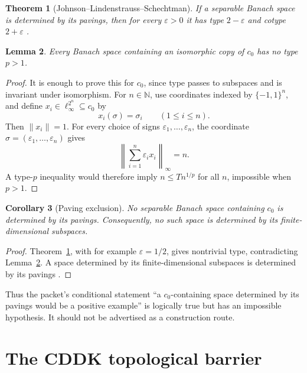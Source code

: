 \documentclass[11pt]{article}
\newtheorem{theorem}{Theorem}[section]
\newtheorem{corollary}[theorem]{Corollary}
\newtheorem{lemma}[theorem]{Lemma}
\theoremstyle{definition}
\newcommand{\czer}{c_0}
\begin{document}
\begin{theorem}[Johnson--Lindenstrauss--Schechtman]\label{thm:JLS}
If a separable Banach space is determined by its pavings, then for every
\(\varepsilon>0\) it has type \(2-\varepsilon\) and cotype
\(2+\varepsilon\) \cite[Proposition 7.4]{JLS}.
\end{theorem}

\begin{lemma}\label{lem:c0type}
Every Banach space containing an isomorphic copy of \(\czer\) has no type
\(p>1\).
\end{lemma}

\begin{proof}
It is enough to prove this for \(\czer\), since type passes to subspaces and
is invariant under isomorphism.  For \(n\in\mathbb N\), use coordinates
indexed by \(\{-1,1\}^n\), and define \(x_i\in\ell_\infty^{2^n}\subseteq\czer\)
by
\[
        x_i(\sigma)=\sigma_i \qquad(1\le i\le n).
\]
Then \(\|x_i\|=1\).  For every choice of signs
\(\varepsilon_1,\ldots,\varepsilon_n\), the coordinate
\(\sigma=(\varepsilon_1,\ldots,\varepsilon_n)\) gives
\[
 \left\|\sum_{i=1}^n\varepsilon_i x_i\right\|_\infty=n.
\]
A type-\(p\) inequality would therefore imply
\(n\le Tn^{1/p}\) for all \(n\), impossible when \(p>1\).
\end{proof}

\begin{corollary}[Paving exclusion]\label{cor:paving}
No separable Banach space containing \(\czer\) is determined by its pavings.
Consequently, no such space is determined by its finite-dimensional
subspaces.
\end{corollary}

\begin{proof}
Theorem~\ref{thm:JLS}, with for example \(\varepsilon=1/2\), gives nontrivial
type, contradicting Lemma~\ref{lem:c0type}.  A space determined by its
finite-dimensional subspaces is determined by its pavings
\cite[Definition 7.2 and the following observation]{JLS}.
\end{proof}

Thus the packet's conditional statement ``a \(\czer\)-containing space
determined by its pavings would be a positive example'' is logically true but
has an impossible hypothesis.  It should not be advertised as a construction
route.

\section{The CDDK topological barrier}
\end{document}
